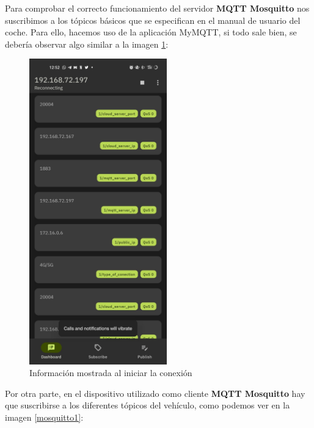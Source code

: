 \begin{enumerate}
{\item Para comprobar el correcto funcionamiento del servidor \textbf{MQTT Mosquitto} nos  suscribimos a los tópicos básicos que se especifican en el manual de usuario del coche. Para ello, hacemos uso de la aplicación MyMQTT, si todo sale bien, se debería observar algo similar a la imagen \ref{mosquitto3}:

 \begin{figure}[H]
    \centering
    \includegraphics[width=0.53\textwidth]{Imagenes/Rendimiento/mosquitto3.jpeg}
    \caption{Información mostrada al iniciar la conexión}
    \label{mosquitto3}
\end{figure}

\item Por otra parte, en el dispositivo utilizado como cliente \textbf{MQTT Mosquitto} hay que suscribirse a los diferentes tópicos del vehículo, como podemos ver en la imagen \ref{mosquitto1}:

}
\end{enumerate}
